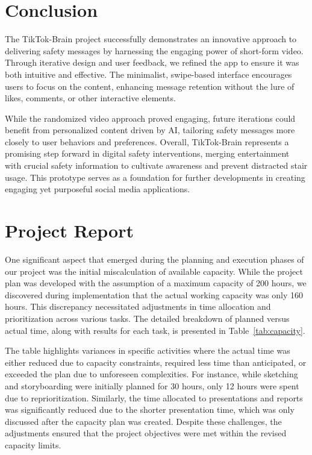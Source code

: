\documentclass{article}
\begin{document}
\section{Conclusion}
The TikTok-Brain project successfully demonstrates an innovative approach
to delivering safety messages by harnessing the engaging power of short-form video.
Through iterative design and user feedback, we refined the app to ensure it was both intuitive and effective.
The minimalist, swipe-based interface encourages users to focus on the content,
enhancing message retention without the lure of likes, comments, or other interactive elements.

While the randomized video approach proved engaging,
future iterations could benefit from personalized content driven by AI,
tailoring safety messages more closely to user behaviors and preferences.
Overall, TikTok-Brain represents a promising step forward in digital safety interventions,
merging entertainment with crucial safety information to cultivate awareness and prevent distracted stair usage.
This prototype serves as a foundation for further developments in creating engaging yet purposeful social media applications.

\section{Project Report}

One significant aspect that emerged during the planning and execution phases of our project
was the initial miscalculation of available capacity.
While the project plan was developed with the assumption of a maximum capacity of 200 hours,
we discovered during implementation that the actual working capacity was only 160 hours.
This discrepancy necessitated adjustments in time allocation and prioritization across various tasks.
The detailed breakdown of planned versus actual time, along with results for each task, is presented in Table~\ref{tab:capacity}.

The table highlights variances in specific activities where the actual time was either reduced due to capacity constraints,
required less time than anticipated, or exceeded the plan due to unforeseen complexities.
For instance, while sketching and storyboarding were initially planned for 30 hours,
only 12 hours were spent due to reprioritization.
Similarly, the time allocated to presentations and reports was significantly reduced due to the shorter presentation time,
which was only discussed after the capacity plan was created.
Despite these challenges, the adjustments ensured that the project objectives were met within the revised capacity limits.
\end{document}
